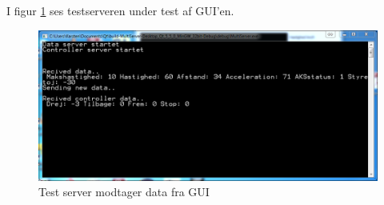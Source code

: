 I figur \ref{fig:testserver} ses testserveren under test af GUI'en. 
\begin{figure}[H]
\centering
\includegraphics[width=\textwidth* 3/4,height=\textwidth* 8/20 ]{../fig/billeder/testserver.png}
\caption{Test server modtager data fra GUI}
\label{fig:testserver}
\end{figure}